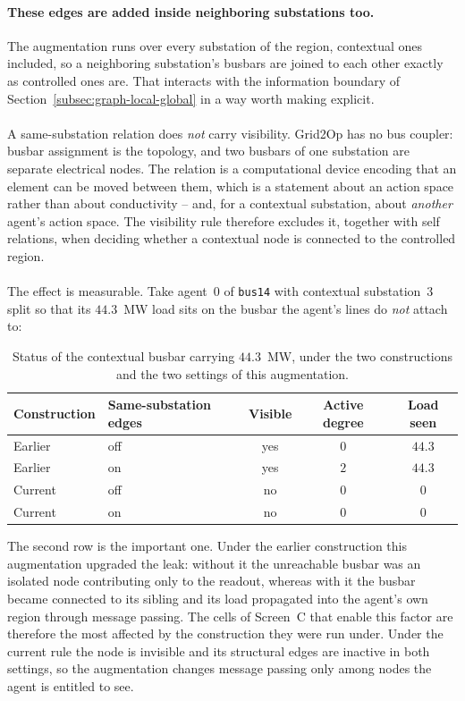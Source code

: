 {\color{clarif}
\paragraph{These edges are added inside neighboring substations too.}
The augmentation runs over every substation of the region, contextual ones
included, so a neighboring substation's busbars are joined to each other exactly
as controlled ones are. That interacts with the information boundary of
Section~\ref{subsec:graph-local-global} in a way worth making explicit.
\\
\\
A same-substation relation does \emph{not} carry visibility. Grid2Op has no bus
coupler: busbar assignment is the topology, and two busbars of one substation
are separate electrical nodes. The relation is a computational device encoding
that an element can be moved between them, which is a statement about an action
space rather than about conductivity -- and, for a contextual substation, about
\emph{another} agent's action space. The visibility rule therefore excludes it,
together with self relations, when deciding whether a contextual node is
connected to the controlled region.
\\
\\
The effect is measurable. Take agent~$0$ of \texttt{bus14} with contextual
substation~$3$ split so that its $44.3$~MW load sits on the busbar the agent's
lines do \emph{not} attach to:

\begin{table}[H]
  \centering
  \small
  \caption{Status of the contextual busbar carrying $44.3$~MW, under the two
  constructions and the two settings of this augmentation.}
  \label{tab:same-substation-visibility}
  \setlength{\tabcolsep}{6pt}
  \begin{tabular}{llccc}
    \toprule
    Construction & Same-substation edges & Visible & Active degree & Load seen \\
    \midrule
    Earlier & off & yes & $0$ & $44.3$ \\
    Earlier & on  & yes & $2$ & $44.3$ \\
    Current & off & no  & $0$ & $0$ \\
    Current & on  & no  & $0$ & $0$ \\
    \bottomrule
  \end{tabular}
\end{table}

\noindent The second row is the important one. Under the earlier construction this
augmentation upgraded the leak: without it the unreachable busbar was an
isolated node contributing only to the readout, whereas with it the busbar
became connected to its sibling and its load propagated into the agent's own
region through message passing. The cells of Screen~C that enable this factor
are therefore the most affected by the construction they were run under. Under
the current rule the node is invisible and its structural edges are inactive in
both settings, so the augmentation changes message passing only among nodes the
agent is entitled to see.

}
